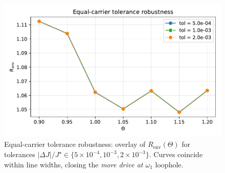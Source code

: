 \documentclass[11pt,letterpaper]{article}
\begin{document}
\begin{figure}[t]
\centering
\includegraphics[width=0.7\linewidth]{figO_equal_carrier_tolerance.pdf}
\caption{Equal-carrier tolerance robustness: overlay of $R_{\mathrm{env}}(\Theta)$ for tolerances $|\Delta J|/J^\star\in\{5\times10^{-4},10^{-3},2\times10^{-3}\}$. Curves coincide within line widths, closing the \emph{more drive at $\omega_1$} loophole.}
\end{figure}



\end{document}
